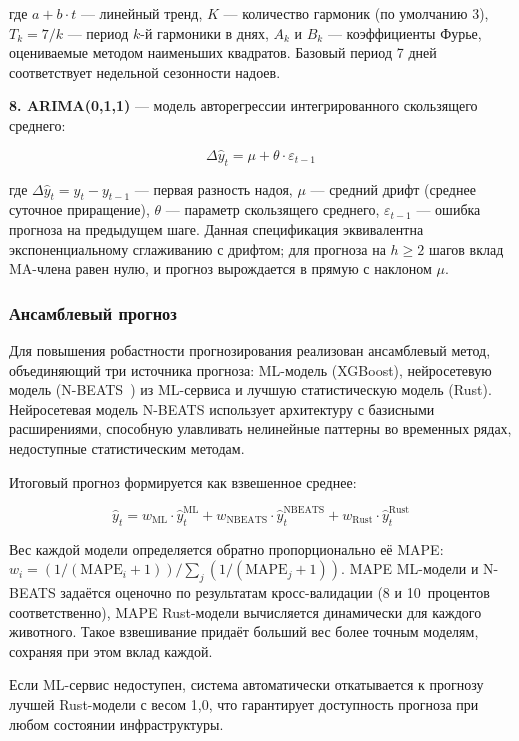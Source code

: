 где $a + b \cdot t$ --- линейный тренд, $K$ --- количество гармоник (по умолчанию 3), $T_k = 7/k$ --- период $k$-й гармоники в днях, $A_k$ и $B_k$ --- коэффициенты Фурье, оцениваемые методом наименьших квадратов. Базовый период 7 дней соответствует недельной сезонности надоев.

\textbf{8. ARIMA(0,1,1)} --- модель авторегрессии интегрированного скользящего среднего:

$$\Delta \hat{y}_t = \mu + \theta \cdot \varepsilon_{t-1}$$

где $\Delta \hat{y}_t = y_t - y_{t-1}$ --- первая разность надоя, $\mu$ --- средний дрифт (среднее суточное приращение), $\theta$ --- параметр скользящего среднего, $\varepsilon_{t-1}$ --- ошибка прогноза на предыдущем шаге. Данная спецификация эквивалентна экспоненциальному сглаживанию с дрифтом; для прогноза на $h \geq 2$ шагов вклад MA-члена равен нулю, и прогноз вырождается в прямую с наклоном $\mu$.

\subsubsection{Ансамблевый прогноз}

Для повышения робастности прогнозирования реализован ансамблевый метод, объединяющий три источника прогноза: ML-модель (XGBoost), нейросетевую модель (N-BEATS~\cite{NBEATS}) из ML-сервиса и лучшую статистическую модель (Rust). Нейросетевая модель N-BEATS использует архитектуру с базисными расширениями, способную улавливать нелинейные паттерны во временных рядах, недоступные статистическим методам.

Итоговый прогноз формируется как взвешенное среднее:

$$\hat{y}_t = w_{\text{ML}} \cdot \hat{y}_t^{\text{ML}} + w_{\text{NBEATS}} \cdot \hat{y}_t^{\text{NBEATS}} + w_{\text{Rust}} \cdot \hat{y}_t^{\text{Rust}}$$

Вес каждой модели определяется обратно пропорционально её MAPE: $w_i = (1 / (\text{MAPE}_i + 1)) / \sum_j (1 / (\text{MAPE}_j + 1))$. MAPE ML-модели и N-BEATS задаётся оценочно по результатам кросс-валидации (8 и 10~процентов соответственно), MAPE Rust-модели вычисляется динамически для каждого животного. Такое взвешивание придаёт больший вес более точным моделям, сохраняя при этом вклад каждой.

Если ML-сервис недоступен, система автоматически откатывается к прогнозу лучшей Rust-модели с весом 1,0, что гарантирует доступность прогноза при любом состоянии инфраструктуры.

